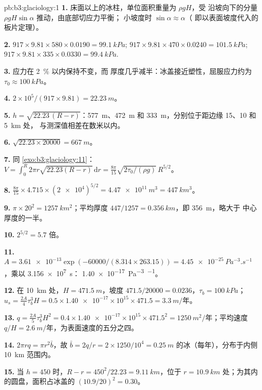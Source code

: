 \begin{solution}{pb:b3:glaciology:1}
\textbf{1.} 床面以上的冰柱，单位面积重量为 $\rho gH$，受
沿坡向下的分量 $\rho gH\sin\alpha$ 推动，由底部切应力平衡；
小坡度时 $\sin\alpha \approx \alpha$（
即以表面坡度代入的板片定理）。

\textbf{2.} $917\times9.81\times580\times0.0190 = \qty{99.1}{kPa}$;
$917\times9.81\times470\times0.0240 = \qty{101.5}{kPa}$; $917\times9.81
\times335\times0.0330 = \qty{99.4}{kPa}$.

\textbf{3.} 应力在 \qty{2}{\percent} 以内保持不变，而
厚度几乎减半：冰盖接近塑性，屈服应力约为 $\tau_0 \approx
\qty{100}{kPa}$。

\textbf{4.} $2\times10^5/(917\times9.81) = \qty{22.23}{m}$。

\textbf{5.} $h = \sqrt{22.23\,(R - r)}$：\qty{577}{m}、\qty{472}{m} 和
\qty{333}{m}，分别位于距边缘 15、10 和 \qty{5}{km} 处，
与测深值相差在数米以内。

\textbf{6.} $\sqrt{22.23\times20000} = \qty{667}{m}$。

\textbf{7.} 同 \cref{exo:b3:glaciology:11}：$V = \int_0^R2\pi r
\sqrt{22.23(R - r)}\,\mathrm dr = \frac{8\pi}{15}\sqrt{2\tau_0/(\rho
g)}\,R^{5/2}$。

\textbf{8.} $\frac{8\pi}{15}\times4.715\times(\num{2e4})^{5/2} =
\qty{4.47e11}{m^3} = \qty{447}{km^3}$。

\textbf{9.} $\pi\times20^2 = \qty{1257}{km^2}$；平均厚度
$447/1257 = \qty{0.356}{km}$，即 \qty{356}{m}，略大于
中心厚度的一半。

\textbf{10.} $2^{5/2} = 5.7$ 倍。

\textbf{11.} $A = \num{3.61e-13}\exp(-60000/(8.314\times263.15)) =
\qty{4.45e-25}{Pa^{-3}.s^{-1}}$，乘以 \qty{3.156e7}{s}：
\qty{1.40e-17}{Pa^{-3}.^{-1}}。

\textbf{12.} 在 \qty{10}{km} 处，$H = \qty{471.5}{m}$，坡度 $471.5/20000 =
\num{0.0236}$，$\tau_b = \qty{100}{kPa}$；$u_s = \tfrac{2A}{4}\tau_b^3H =
0.5\times\num{1.40e-17}\times10^{15}\times471.5 = \qty{3.3}{m/\text{年}}$。

\textbf{13.} $q = \tfrac{2A}{5}\tau_b^3H^2 = 0.4\times\num{1.40e-17}
\times10^{15}\times471.5^2 = \qty{1250}{m^2/\text{年}}$；平均速度 $q/H =
\qty{2.6}{m/\text{年}}$，为表面速度的五分之四。

\textbf{14.} $2\pi rq = \pi r^2\bar b$，故 $\bar b = 2q/r = 2\times1250/10^4
= \qty{0.25}{m}$ 的冰（每年），分布于内侧 \qty{10}{km} 范围内。

\textbf{15.} 当 $h = 450$ 时，$R - r = 450^2/22.23 = \qty{9.11}{km}$，位于
$r = \qty{10.9}{km}$ 处；为其内的圆盘，面积占冰盖的 $(10.9/
20)^2 = 0.30$。


\end{solution}
